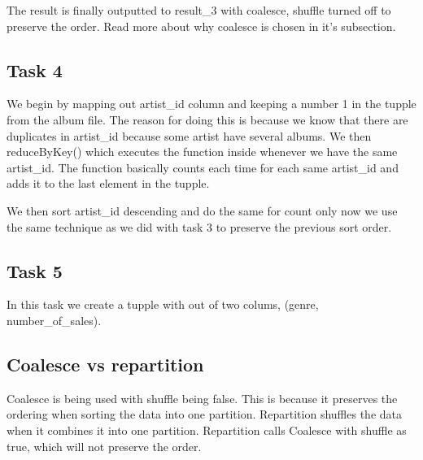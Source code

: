 \documentclass[12pt]{article}
\begin{document}
The result is finally outputted to result_3 with coalesce, shuffle turned off to preserve the order. Read more about why coalesce is chosen in it's subsection.

\subsection{Task 4}

We begin by mapping out artist_id column and keeping a number 1 in the tupple from the album file. The reason for doing this is because we know that there are duplicates in artist_id because some artist have several albums. We then reduceByKey() which executes the function inside whenever we have the same artist_id. The function basically counts each time for each same artist_id and adds it to the last element in the tupple. 

We then sort artist_id descending and do the same for count only now we use the same technique as we did with task 3 to preserve the previous sort order.

\subsection{Task 5}

In this task we create a tupple with out of two colums, (genre, number_of_sales).

\subsection{Coalesce vs repartition}

Coalesce is being used with shuffle being false. This is because it preserves the ordering when sorting the data into one partition. Repartition shuffles the data when it combines it into one partition. Repartition calls Coalesce with shuffle as true, which will not preserve the order.
\end{document}
